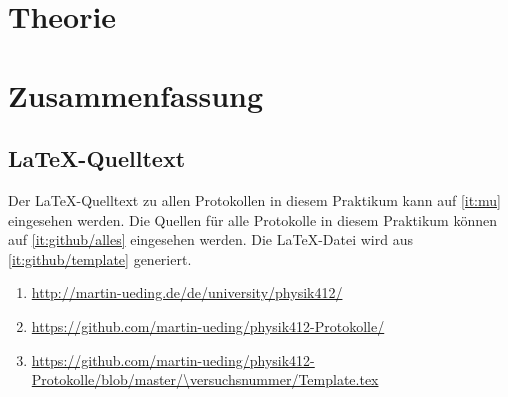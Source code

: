 
\FloatBarrier
\section{Theorie}


\FloatBarrier
\section{Zusammenfassung}

\fehlt


\FloatBarrier
\begin{appendix}
    \FloatBarrier
    \section{\LaTeX-Quelltext}

    Der \LaTeX-Quelltext zu allen Protokollen in diesem Praktikum kann auf
    \ref{it:mu} eingesehen werden. Die Quellen für alle Protokolle in diesem
    Praktikum können auf \ref{it:github/alles} eingesehen werden. Die
    \LaTeX-Datei wird aus \ref{it:github/template} generiert.

    \begin{enumerate}
        \item
            \label{it:mu}
            \url{http://martin-ueding.de/de/university/physik412/}
        \item
            \label{it:github/alles}
            \url{https://github.com/martin-ueding/physik412-Protokolle/}
        \item
            \label{it:github/template}
            \url{https://github.com/martin-ueding/physik412-Protokolle/blob/master/\versuchsnummer/Template.tex}
    \end{enumerate}
\end{appendix}


\FloatBarrier
\printbibliography



